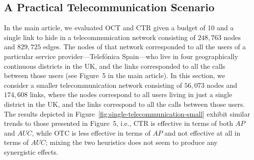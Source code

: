 \documentclass[twocolumn]{article}
\newcommand{\ROC}{\mathit{AUC}}
\newcommand{\AP}{\mathit{AP}}
\newcommand{\Hide}{H}
\begin{document}

\clearpage
\subsection{A Practical Telecommunication Scenario}\label{sec:supplementary:Telecommunication}

\noindent In the main article, we evaluated OCT and CTR given a budget of 10 and a single link to hide in a telecommunication network consisting of $248,763$ nodes and $829,725$ edges. The nodes of that network corresponded to all the users of a particular service provider---Telef\'onica Spain---who live in four geographically continuous districts in the UK, and the links corresponded to all the calls between those users (see Figure~5 in the main article). In this section, we consider a smaller telecommunication network consisting of $56,073$ nodes and $174,608$ links, where the nodes correspond to all users living in just a single district in the UK, and the links correspond to all the calls between those users. The results depicted in Figure~\ref{fig:single-telecommunication-small} exhibit similar trends to those presented in Figure~5, i.e., CTR is effective in terms of both $\AP$ and $\ROC$, while OTC is less effective in terms of $\AP$ and not effective at all in terms of $\ROC$; mixing the two heuristics does not seem to produce any synergistic effects.
\end{document}
